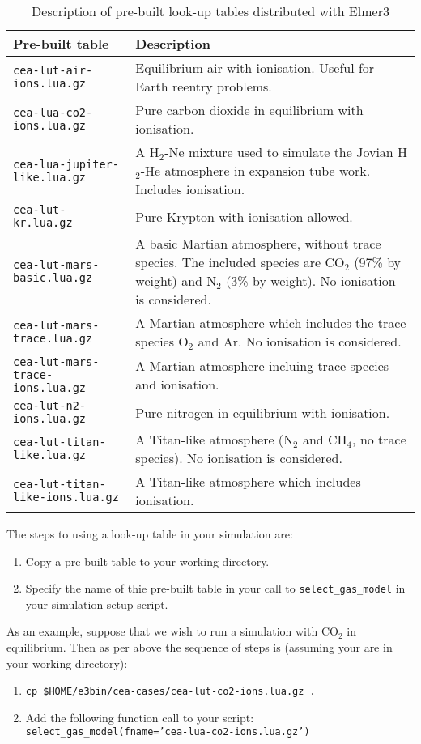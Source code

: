 \begin{table}[ht]
\begin{center}
\caption{Description of pre-built look-up tables distributed with Elmer3}
\label{tab:lut}
\begin{tabular}{lp{8cm}}
 \hline \hline
Pre-built table & Description \\
\hline
\texttt{cea-lut-air-ions.lua.gz} & Equilibrium air with ionisation. Useful for Earth reentry problems. \\
\texttt{cea-lua-co2-ions.lua.gz} & Pure carbon dioxide in equilibrium with ionisation. \\
\texttt{cea-lua-jupiter-like.lua.gz} & A H$_2$-Ne mixture used to simulate the Jovian H$_2$-He atmosphere
                                       in expansion tube work. Includes ionisation. \\
\texttt{cea-lut-kr.lua.gz} & Pure Krypton with ionisation allowed. \\
\texttt{cea-lut-mars-basic.lua.gz} & A basic Martian atmosphere, without trace species.  The included species
                                     are CO$_2$ (97\% by weight) and N$_2$ (3\% by weight).  No ionisation is considered. \\
\texttt{cea-lut-mars-trace.lua.gz} & A Martian atmosphere which includes the trace species O$_2$ and Ar. No ionisation is considered. \\
\texttt{cea-lut-mars-trace-ions.lua.gz} & A Martian atmosphere incluing trace species and ionisation. \\
\texttt{cea-lut-n2-ions.lua.gz} & Pure nitrogen in equilibrium with ionisation. \\
\texttt{cea-lut-titan-like.lua.gz} & A Titan-like atmosphere (N$_2$ and CH$_4$, no trace species). No ionisation is considered. \\
\texttt{cea-lut-titan-like-ions.lua.gz} & A Titan-like atmosphere which includes ionisation. \\
\hline
\end{tabular}
\end{center}
\end{table}

The steps to using a look-up table in your simulation are:
\begin{enumerate}
 \item Copy a pre-built table to your working directory.
 \item Specify the name of thie pre-built table in your call to \texttt{select\_gas\_model} in your
       simulation setup script.
\end{enumerate}
As an example, suppose that we wish to run a simulation with CO$_2$ in equilibrium.
Then as per above the sequence of steps is (assuming your are in your working directory):
\begin{enumerate}
 \item \texttt{cp \$HOME/e3bin/cea-cases/cea-lut-co2-ions.lua.gz .}
 \item Add the following function call to your script:\\
       \texttt{select\_gas\_model(fname='cea-lua-co2-ions.lua.gz')}
\end{enumerate}

